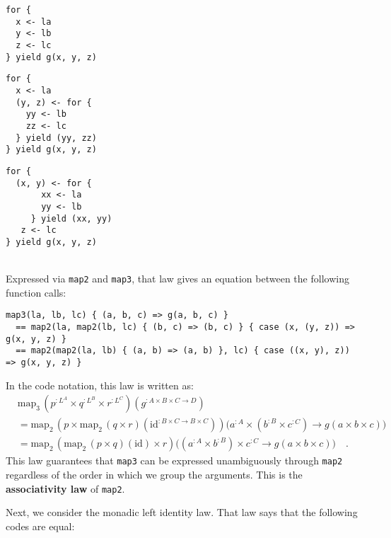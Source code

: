 \noindent %
\begin{minipage}[c][1\totalheight][t]{0.3\columnwidth}%
\begin{lstlisting}
for {
  x <- la
  y <- lb
  z <- lc
} yield g(x, y, z)
\end{lstlisting}
%
\end{minipage}\hfill{}%
\begin{minipage}[c][1\totalheight][t]{0.3\columnwidth}%
\begin{lstlisting}
for {
  x <- la
  (y, z) <- for {
    yy <- lb
    zz <- lc
  } yield (yy, zz)
} yield g(x, y, z)
\end{lstlisting}
%
\end{minipage}\hfill{}%
\begin{minipage}[c][1\totalheight][t]{0.3\columnwidth}%
\begin{lstlisting}
for {
  (x, y) <- for {
       xx <- la
       yy <- lb
     } yield (xx, yy)
   z <- lc
} yield g(x, y, z)
\end{lstlisting}
%
\end{minipage}\\
Expressed via \lstinline!map2! and \lstinline!map3!, that law gives
an equation between the following function calls:
\begin{lstlisting}
map3(la, lb, lc) { (a, b, c) => g(a, b, c) }
  == map2(la, map2(lb, lc) { (b, c) => (b, c) } { case (x, (y, z)) => g(x, y, z) }
  == map2(map2(la, lb) { (a, b) => (a, b) }, lc) { case ((x, y), z)) => g(x, y, z) } 
\end{lstlisting}
In the code notation, this law is written as:
\begin{align*}
 & \text{map}_{3}\,(p^{:L^{A}}\times q^{:L^{B}}\times r^{:L^{C}})(g^{:A\times B\times C\rightarrow D})\\
 & =\text{map}_{2}\,(p\times\text{map}_{2}\,(q\times r)(\text{id}^{:B\times C\rightarrow B\times C}))\big(a^{:A}\times(b^{:B}\times c^{:C})\rightarrow g(a\times b\times c)\big)\\
 & =\text{map}_{2}\,(\text{map}_{2}\,(p\times q)(\text{id})\times r)\big((a^{:A}\times b^{:B})\times c^{:C}\rightarrow g(a\times b\times c)\big)\quad.
\end{align*}
This law guarantees that \lstinline!map3! can be expressed unambiguously
through \lstinline!map2! regardless of the order in which we group
the arguments. This is the \textbf{associativity
law} of \lstinline!map2!.

Next, we consider the monadic left identity law. That law says that
the following codes are equal:

